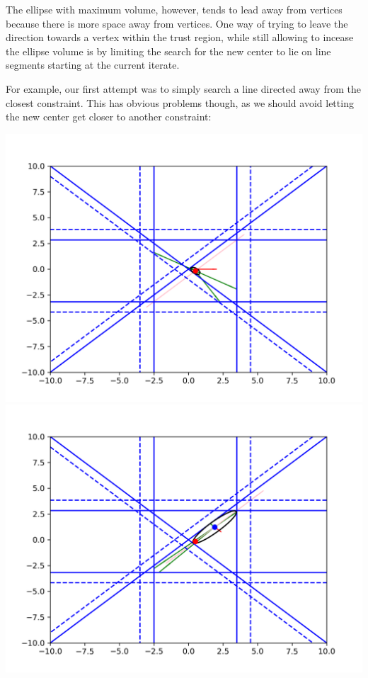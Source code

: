 \documentclass{article}
\begin{document}
The ellipse with maximum volume, however, tends to lead away from vertices because there is more space away from vertices.
One way of trying to leave the direction towards a vertex within the trust region, while still allowing to incease the ellipse volume is by limiting the search for the new center to lie on line segments starting at the current iterate.

For example, our first attempt was to simply search a line directed away from the closest constraint.
This has obvious problems though, as we should avoid letting the new center get closer to another constraint:

\includegraphics[scale=0.2]{line_1.png}
\includegraphics[scale=0.2]{line_2.png}
\end{document}

